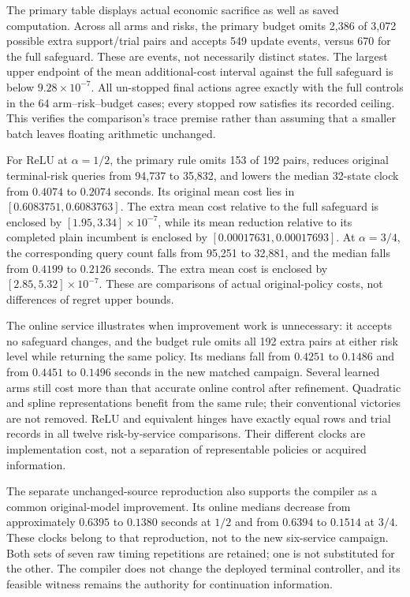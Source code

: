 


The primary table displays actual economic sacrifice as well as saved computation. Across all arms and risks, the primary budget omits 2,386 of 3,072 possible extra support/trial pairs and accepts 549 update events, versus 670 for the full safeguard. These are events, not necessarily distinct states. The largest upper endpoint of the mean additional-cost interval against the full safeguard is below $9.28\times10^{-7}$. All un-stopped final actions agree exactly with the full controls in the 64 arm--risk--budget cases; every stopped row satisfies its recorded ceiling. This verifies the comparison's trace premise rather than assuming that a smaller batch leaves floating arithmetic unchanged.

For ReLU at $\alpha=1/2$, the primary rule omits 153 of 192 pairs, reduces original terminal-risk queries from 94,737 to 35,832, and lowers the median 32-state clock from $0.4074$ to $0.2074$ seconds. Its original mean cost lies in $[0.6083751,0.6083763]$. The extra mean cost relative to the full safeguard is enclosed by $[1.95,3.34]\times10^{-7}$, while its mean reduction relative to its completed plain incumbent is enclosed by $[0.00017631,0.00017693]$. At $\alpha=3/4$, the corresponding query count falls from 95,251 to 32,881, and the median falls from $0.4199$ to $0.2126$ seconds. The extra mean cost is enclosed by $[2.85,5.32]\times10^{-7}$. These are comparisons of actual original-policy costs, not differences of regret upper bounds.

The online service illustrates when improvement work is unnecessary: it accepts no safeguard changes, and the budget rule omits all 192 extra pairs at either risk level while returning the same policy. Its medians fall from $0.4251$ to $0.1486$ and from $0.4451$ to $0.1496$ seconds in the new matched campaign. Several learned arms still cost more than that accurate online control after refinement. Quadratic and spline representations benefit from the same rule; their conventional victories are not removed. ReLU and equivalent hinges have exactly equal rows and trial records in all twelve risk-by-service comparisons. Their different clocks are implementation cost, not a separation of representable policies or acquired information.

The separate unchanged-source reproduction also supports the compiler as a common original-model improvement. Its online medians decrease from approximately $0.6395$ to $0.1380$ seconds at $1/2$ and from $0.6394$ to $0.1514$ at $3/4$. These clocks belong to that reproduction, not to the new six-service campaign. Both sets of seven raw timing repetitions are retained; one is not substituted for the other. The compiler does not change the deployed terminal controller, and its feasible witness remains the authority for continuation information.

